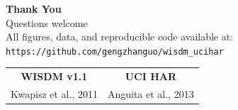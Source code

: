 \documentclass[aspectratio=169, 10pt]{beamer}
\begin{document}
\begin{frame}[plain]
  \begin{center}
    \vspace{12mm}
    {\Large \textbf{Thank You}}\\[6mm]
    {\normalsize Questions welcome}\\[10mm]
    \textcolor{noteGray}{\small
      All figures, data, and reproducible code available at:\\[2mm]
      \texttt{https://github.com/gengzhanguo/wisdm\_ucihar}
    }\\[12mm]
    \begin{tabular}{cc}
      \textcolor{wisdmOrange}{\textbf{WISDM v1.1}} & \textcolor{uciBlue}{\textbf{UCI HAR}} \\
      Kwapisz et al., 2011 & Anguita et al., 2013
    \end{tabular}
  \end{center}
\end{frame}
\end{document}

